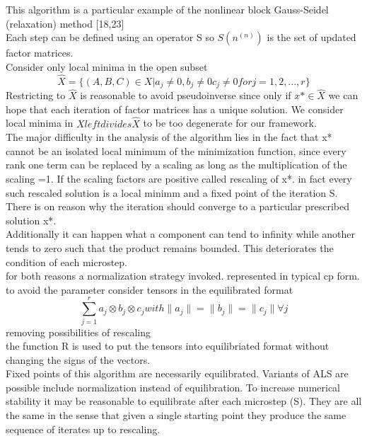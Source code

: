 \documentclass[10pt, draft]{article}
\begin{document}
  This algorithm is a particular example of the nonlinear block Gauss-Seidel (relaxation) method [18,23]\\
  Each step can be defined using an operator S so $S(n^{(n)})$ is the set of updated factor matrices.\\
  
  Consider only local minima in the open subset 
  \[ \hat{X} = \{(A,B,C) \in X | a_j \neq 0, b_j \neq 0 c_j \neq 0 for j = 1,2,...,r\} \]
  Restricting to $\hat{X}$ is reasonable to avoid pseudoinverse since only if $x*\in \hat{X}$ we can hope that each iteration of factor matrices has a unique solution. We consider local minima in $X left divides \hat{X}$ to be too degenerate for our framework.  \\
  The major difficulty in the analysis of the algorithm lies in the fact that x* cannot be an isolated local minimum of the minimization function, since every rank one term can be replaced by a scaling as long as the multiplication of the scaling =1.  If the scaling factors are positive called rescaling of x*.  in fact every such rescaled solution is a local minimm and a fixed point of the iteration S.\\
  There is on reason why the iteration should converge to a particular prescribed solution x*.\\
  Additionally it can happen what a component can tend to infinity while another tends to zero such that the product remains bounded.  This deteriorates the condition of each microstep.  \\
  for both reasons a normalization strategy invoked.  represented in typical cp form.\\
  to avoid the parameter consider tensors in the equilibrated format 
  \[ \sum_{j=1}^r a_j \otimes b_j \otimes c_j with \|a_j\| = \|b_j\| = \|c_j\| \forall j\]
  removing possibilities of rescaling\\
  the function R is used to put the tensors into equilibriated format without changing the signs of the vectors.\\
  Fixed points of this algorithm are necessarily equilibrated.  Variants of ALS are possible include normalization instead of equilibration.  To increase numerical stability it may be reasonable to equilibrate after each microstep (S).  They are all the same in the sense that given a single starting point they produce the same sequence of iterates up to rescaling.  
  
  
\end{document}
